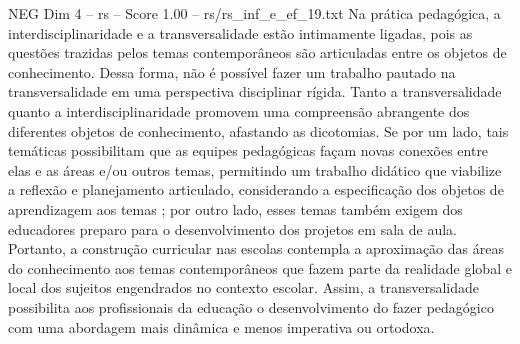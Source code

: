 \begin{textsample}{NEG Dim 4 – rs – Score 1.00 – rs/rs\_inf\_e\_ef\_19.txt}
Na prática pedagógica, a interdisciplinaridade e a transversalidade estão intimamente ligadas, pois as questões trazidas pelos temas contemporâneos são articuladas entre os objetos de conhecimento.
Dessa forma, não é possível fazer um trabalho pautado na transversalidade em uma perspectiva disciplinar rígida.
Tanto a transversalidade quanto a interdisciplinaridade promovem uma compreensão abrangente dos diferentes objetos de conhecimento, afastando as dicotomias.
Se por um lado, tais temáticas possibilitam que as equipes pedagógicas façam novas conexões entre elas e as áreas e/ou outros temas, permitindo um trabalho didático que viabilize a reflexão e planejamento articulado, considerando a especificação dos objetos de aprendizagem aos temas ; por outro lado, esses temas também exigem dos educadores preparo para o desenvolvimento dos projetos em sala de aula.
Portanto, a construção curricular nas escolas contempla a aproximação das áreas do conhecimento aos temas contemporâneos que fazem parte da realidade global e local dos sujeitos engendrados no contexto escolar.
Assim, a transversalidade possibilita aos profissionais da educação o desenvolvimento do fazer pedagógico com uma abordagem mais dinâmica e menos imperativa ou ortodoxa.

\end{textsample}
